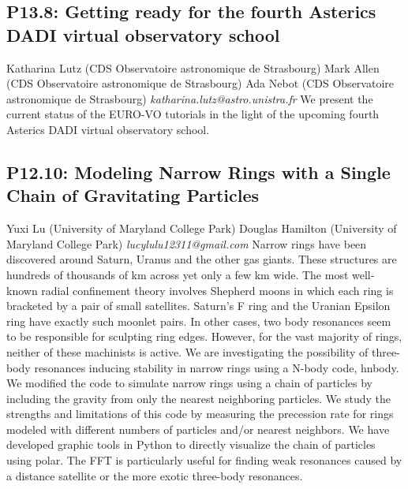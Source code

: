 \documentclass{report}
\begin{document}
\subsection*{P13.8: Getting ready for the fourth Asterics DADI virtual observatory school}
\bigskip
Katharina Lutz (CDS Observatoire astronomique de Strasbourg) \newline Mark Allen (CDS Observatoire astronomique de Strasbourg) \newline  Ada Nebot (CDS Observatoire astronomique de Strasbourg)\newline   \newline  \newline  \newline\newline
{\it katharina.lutz@astro.unistra.fr}\newline
\newline\newline
We present the current status of the EURO-VO tutorials in the light of the upcoming fourth Asterics DADI virtual observatory school.\newline
\newpage
\subsection*{P12.10: Modeling Narrow Rings with a Single Chain of Gravitating Particles}
\bigskip
Yuxi Lu (University of Maryland College Park) \newline Douglas Hamilton (University of Maryland College Park) \newline   \newline   \newline  \newline  \newline\newline
{\it lucylulu12311@gmail.com}\newline
\newline\newline
Narrow rings have been discovered around Saturn, Uranus and the other gas giants. These structures are hundreds of thousands of km across yet only a few km wide. The most well-known radial confinement theory involves Shepherd moons in which each ring is bracketed by a pair of small satellites. Saturn’s F ring and the Uranian Epsilon ring have exactly such moonlet pairs. In other cases, two body resonances seem to be responsible for sculpting ring edges. However, for the vast majority of rings, neither of these machinists is active. We are investigating the possibility of three-body resonances inducing stability in narrow rings using a N-body code, hnbody. We modified the code to simulate narrow rings using a chain of particles by including the gravity from only the nearest neighboring particles. We study the strengths and limitations of this code by measuring the precession rate for rings modeled with different numbers of particles and/or nearest neighbors. We have developed graphic tools in Python to directly visualize the chain of particles using polar. The FFT is particularly useful for finding weak resonances caused by a distance satellite or the more exotic three-body resonances.\newline
\newpage
\end{document}
